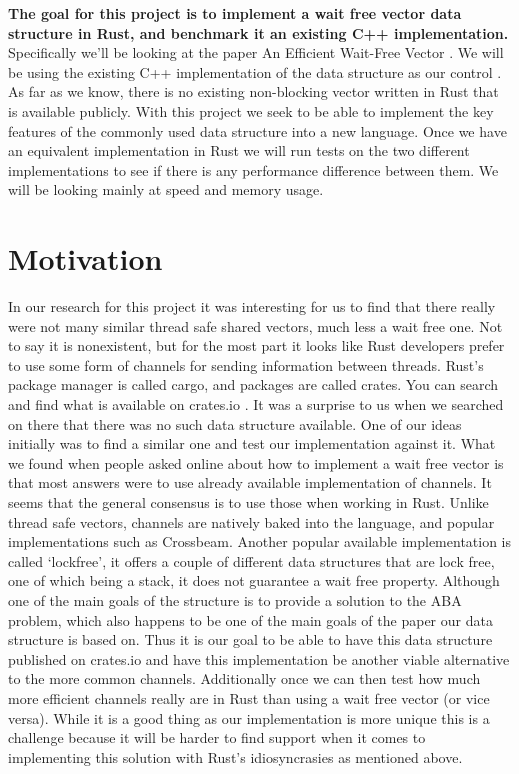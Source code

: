 \documentclass[conference]{IEEEtran}
\begin{document}
\textbf{The goal for this project is to implement a wait free vector data structure in Rust, and benchmark it an existing C++ implementation.} Specifically we’ll be looking at the paper An Efficient Wait-Free Vector \cite{main}. We will be using the existing C++ implementation of the data structure as our control \cite{cpp}. As far as we know, there is no existing non-blocking vector written in Rust that is available publicly. With this project we seek to be able to implement the key features of the commonly used data structure into a new language. Once we have an equivalent implementation in Rust we will run tests on the two different implementations to see if there is any performance difference between them. We will be looking mainly at speed and memory usage.

\section{Motivation}

In our research for this project it was interesting for us to find that there really were not many similar thread safe shared vectors, much less a wait free one. Not to say it is nonexistent, but for the most part it looks like Rust developers prefer to use some form of channels for sending information between threads. Rust’s package manager is called cargo, and packages are called crates. You can search and find what is available on crates.io . It was a surprise to us when we searched on there that there was no such data structure available. One of our ideas initially was to find a similar one and test our implementation against it. 
What we found when people asked online about how to implement a wait free vector is that most answers were to use already available implementation of channels. It seems that the general consensus is to use those when working in Rust. Unlike thread safe vectors, channels are natively baked into the language, and popular implementations such as Crossbeam.
Another popular available implementation is called ‘lockfree’, it offers a couple of different data structures that are lock free, one of which being a stack, it does not guarantee a wait free property. Although one of the main goals of the structure is to provide a solution to the ABA problem, which also happens to be one of the main goals of the paper our data structure is based on. 
Thus it is our goal to be able to have this data structure published on crates.io and have this implementation be another viable alternative to the more common channels. Additionally once we can then test how much more efficient channels really are in Rust than using a wait free vector (or vice versa).
While it is a good thing as our implementation is more unique this is a challenge because it will be harder to find support when it comes to implementing this solution with Rust’s idiosyncrasies as mentioned above.
\end{document}

